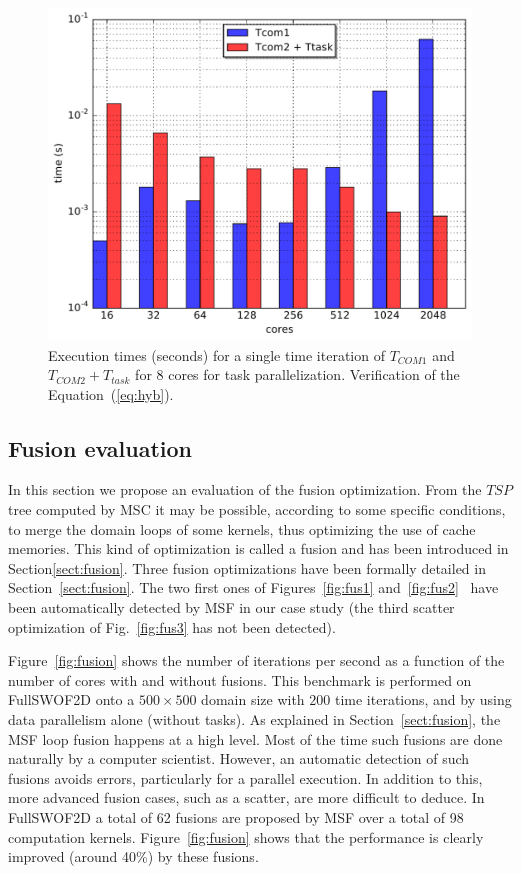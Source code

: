 \begin{figure}[!h]\begin{center}
  \includegraphics[width=.6\textwidth]{../results/task_scaling/500_200/analytic/tth2.pdf}
  \caption{Execution times (seconds) for a single time iteration of $T_{COM1}$ and $T_{COM2} + T_{task}$ for 8 cores for task parallelization. Verification of the Equation~(\ref{eq:hyb}).}
  \label{fig:tth2}
\end{center}\end{figure}

\subsection{Fusion evaluation}
\label{sect:fus}

In this section we propose an evaluation of the fusion optimization. From the $TSP$ tree computed by MSC it may be possible, according to some specific conditions, to merge the domain loops of some kernels, thus optimizing the use of cache memories. This kind of optimization is called a fusion and has been introduced in Section\ref{sect:fusion}. Three fusion optimizations
%
have been formally detailed in Section~\ref{sect:fusion}. The two first ones of Figures~\ref{fig:fus1} and~\ref{fig:fus2}~ have been automatically detected by MSF in our case study (\ie the third scatter optimization of Fig.~\ref{fig:fus3} has not been detected).

Figure~\ref{fig:fusion} shows the number of iterations per second as a function of the number of cores with and without fusions. This benchmark is performed on FullSWOF2D onto a $500 \times 500$ domain size with $200$ time iterations, and by using data parallelism alone (without tasks). As explained in Section~\ref{sect:fusion}, the MSF loop fusion happens at a high level. Most of the time such fusions are done naturally by a computer scientist. However, an automatic detection of such fusions avoids errors, particularly for a parallel execution. In addition to this, more advanced fusion cases, such as a scatter, are more difficult to deduce. In FullSWOF2D a total of  62 fusions are proposed by MSF over a total of 98 computation kernels. Figure~\ref{fig:fusion} shows that the performance is clearly improved (around 40\%) by these fusions.

